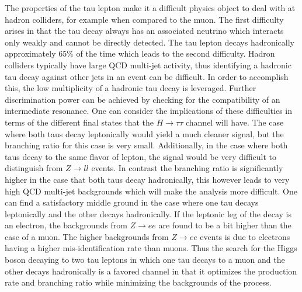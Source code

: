 The properties of the tau lepton make it a difficult physics object to deal with at hadron colliders, for example when compared to the muon.
The first difficulty arises in that the tau decay always has an associated neutrino which interacts only weakly and cannot be directly detected.
The tau lepton decays hadronically approximately 65\% of the time which leads to the second difficulty. 
Hadron colliders typically have large QCD multi-jet activity, thus identifying a hadronic tau decay against other jets in an event can be difficult.
In order to accomplish this, the low multiplicity of a hadronic tau decay is leveraged. 
Further discrimination power can be achieved by checking for the compatibility of an intermediate resonance.
One can consider the implications of these difficulties in terms of the different final states that the $H\rightarrow\tau\tau$ channel will have.
The case where both taus decay leptonically would yield a much cleaner signal, but the branching ratio for this case is very small.
Additionally, in the case where both taus decay to the same flavor of lepton, the signal would be very difficult to distinguish from $Z\rightarrow ll$ events.
In contrast the branching ratio is significantly higher in the case that both taus decay hadronically, this however leads to very high QCD multi-jet backgrounds which will make the analysis more difficult.
One can find a satisfactory middle ground in the case where one tau decays leptonically and the other decays hadronically.
If the leptonic leg of the decay is an electron, the backgrounds from $Z\rightarrow ee$ are found to be a bit higher than the case of a muon. 
The higher backgrounds from $Z\rightarrow ee$ events is due to electrons having a higher mis-identification rate than muons.
Thus the search for the Higgs boson decaying to two tau leptons in which one tau decays to a muon and the other decays hadronically is a favored channel in that it optimizes the production rate and branching ratio while minimizing the backgrounds of the process.

